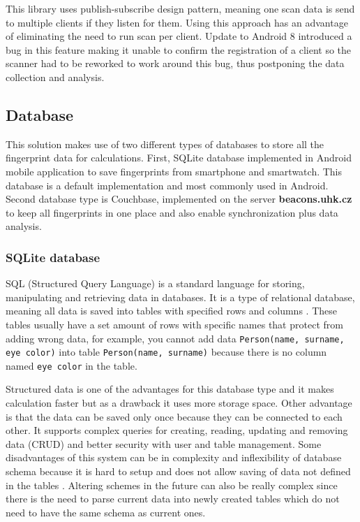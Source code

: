 This library uses publish-subscribe design pattern, meaning one scan data is send to multiple clients if they listen for them. Using this approach has an advantage of eliminating the need to run scan per client. Update to Android 8 introduced a bug in this feature making it unable to confirm the registration of a client so the scanner had to be reworked to work around this bug, thus postponing the data collection and analysis.

\subsection{Database}\label{subsec:Database}
This solution makes use of two different types of databases to store all the fingerprint data for calculations. First, SQLite database implemented in Android mobile application to save fingerprints from smartphone and smartwatch. This database is a default implementation and most commonly used in Android. Second database type is Couchbase, implemented on the server \textbf{beacons.uhk.cz} to keep all fingerprints in one place and also enable synchronization plus data analysis.

\subsubsection{SQLite database}\label{subsec:SQLiteDatabase}
SQL (Structured Query Language) is a standard language for storing, manipulating and retrieving data in databases. It is a type of relational database, meaning all data is saved into tables with specified rows and columns \cite{WISQLITE}. These tables usually have a set amount of rows with specific names that protect from adding wrong data, for example, you cannot add data \verb|Person(name, surname, eye color)| into table \verb|Person(name, surname)| because there is no column named \verb|eye color| in the table.

Structured data is one of the advantages for this database type and it makes calculation faster but as a drawback it uses more storage space. Other advantage is that the data can be saved only once because they can be connected to each other. It supports complex queries for creating, reading, updating and removing data (CRUD) and better security with user and table management. Some disadvantages of this system can be in complexity and inflexibility of database schema because it is hard to setup and does not allow saving of data not defined in the tables \cite{ERDMS}. Altering schemes in the future can also be really complex since there is the need to parse current data into newly created tables which do not need to have the same schema as current ones.

